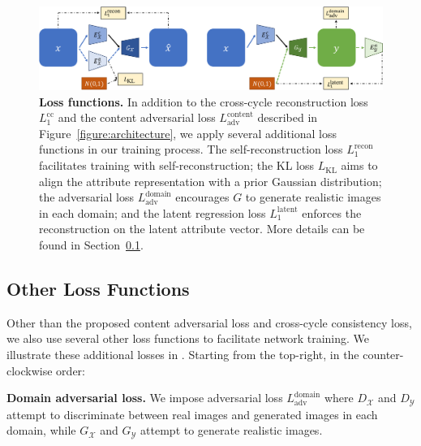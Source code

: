 \documentclass[runningheads]{llncs}
\begin{document}
\begin{figure}[t]
	\centering
		\includegraphics[width=\linewidth]{Figures/architecture_otherloss.pdf}%
	\caption{\textbf{Loss functions.} 
    In addition to the cross-cycle reconstruction loss $L_1^{\mathrm{cc}}$ and the content adversarial loss $L_{\mathrm{adv}}^\mathrm{content}$ described in Figure~\ref{figure:architecture}, we apply several additional loss functions in our training process. 
    The self-reconstruction loss $L_1^{\mathrm{recon}}$ facilitates training with self-reconstruction;
    the KL loss $L_{\mathrm{KL}}$ aims to align the attribute representation with a prior Gaussian distribution;
    the adversarial loss $L_{\mathrm{adv}}^{\mathrm{domain}}$ encourages $G$ to generate realistic images in each domain; 
    and the latent regression loss $L_1^{\mathrm{latent}}$ enforces the reconstruction on the latent attribute vector.
    More details can be found in Section~\ref{subsec:learn}.}
	\label{figure:loss}
    \vspace{\figmargin}
\end{figure}

\subsection{Other Loss Functions}
\label{subsec:learn}
\vspace{\subsecmargin}
Other than the proposed content adversarial loss and cross-cycle consistency loss, we also use several other loss functions to facilitate network training.
%
We illustrate these additional losses in . 
%
Starting from the top-right, in the counter-clockwise order:
%

\noindent \textbf{Domain adversarial loss.}
%
We impose adversarial loss $L_{\mathrm{adv}}^{\mathrm{domain}}$ where $D_\mathcal{X}$ and $D_\mathcal{Y}$ attempt to discriminate between real images and generated images in each domain, while $G_\mathcal{X}$ and $G_\mathcal{Y}$ attempt to generate realistic images.
%
\end{document}

